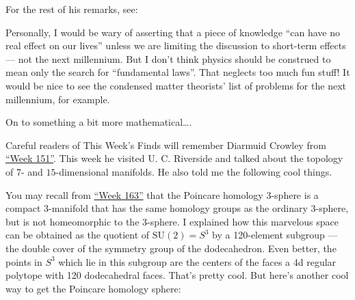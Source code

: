 \documentclass{article}
\def\tightlist{}
\renewcommand{\texttt}[1]{%
  \begingroup
  \ttfamily
  \begingroup\lccode`~=`/\lowercase{\endgroup\def~}{/\discretionary{}{}{}}%
  \begingroup\lccode`~=`[\lowercase{\endgroup\def~}{[\discretionary{}{}{}}%
  \begingroup\lccode`~=`.\lowercase{\endgroup\def~}{.\discretionary{}{}{}}%
  \catcode`/=\active\catcode`[=\active\catcode`.=\active
  \scantokens{#1\noexpand}%
  \endgroup
}
\begin{document}
For the rest of his remarks, see:


Personally, I would be wary of asserting that a piece of knowledge ``can
have no real effect on our lives'' unless we are limiting the discussion
to short-term effects --- not the next millennium. But I don't think
physics should be construed to mean only the search for ``fundamental
laws''. That neglects too much fun stuff! It would be nice to see the
condensed matter theorists' list of problems for the next millennium,
for example.

On to something a bit more mathematical\ldots.

Careful readers of This Week's Finds will remember Diarmuid Crowley from
\protect\hyperlink{week151}{``Week 151''}. This week he visited U. C.
Riverside and talked about the topology of 7- and \(15\)-dimensional
manifolds. He also told me the following cool things.

You may recall from \protect\hyperlink{week163}{``Week 163''} that the
Poincare homology 3-sphere is a compact 3-manifold that has the same
homology groups as the ordinary 3-sphere, but is not homeomorphic to the
3-sphere. I explained how this marvelous space can be obtained as the
quotient of \(\mathrm{SU}(2) = S^3\) by a 120-element subgroup --- the
double cover of the symmetry group of the dodecahedron. Even better, the
points in \(S^3\) which lie in this subgroup are the centers of the
faces a 4d regular polytope with 120 dodecahedral faces. That's pretty
cool. But here's another cool way to get the Poincare homology sphere:
\end{document}
